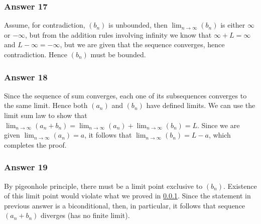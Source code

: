 \documentclass[11pt]{article}
\begin{document}
\subsubsection{Answer 17}
\label{sec-1-5-1}
Assume, for contradiction, $(b_n)$ is unbounded, then $\lim_{n \to
    \infty}(b_n)$ is either $\infty$ or $-\infty$, but from the addition
rules involving infinity we know that $\infty + L = \infty$ and
$L - \infty = -\infty$, but we are given that the sequence converges,
hence contradiction.  Hence $(b_n)$ must be bounded.
\subsubsection{Answer 18}
\label{sec-1-5-2}
Since the sequence of sum converges, each one of its subsequences converges
to the same limit.  Hence both $(a_n)$ and $(b_n)$ have defined limits.  We
can use the limit sum law to show that $\lim_{n \to \infty}(a_n + b_n) =
    \lim_{n \to \infty}(a_n) + \lim_{n \to \infty}(b_n) = L$.  Since we are
given $\lim_{n \to \infty}(a_n) = a$, it follows that $\lim_{n \to
    \infty}(b_n) = L - a$, which completes the proof.
\subsubsection{Answer 19}
\label{sec-1-5-3}
By pigeonhole principle, there must be a limit point exclusive to $(b_n)$.
Existence of this limit point would violate what we proved in \ref{sec-1-5-1}.
Since the statement in previous answer is a biconditional, then, in
particular, it follows that sequence $(a_n + b_n)$ diverges (has no finite
limit).
\end{document}
